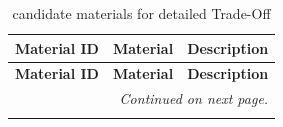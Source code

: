 \begin{longtable}{|c|p{2.25cm}|p{10.75cm}|}
        \caption{candidate materials for detailed Trade-Off}
        \label{tab:materials_trade-off_candidates_desc}\\

\hline
       \textbf{Material ID} & \textbf{Material} & \textbf{Description}\\\hline\hline
\endfirsthead

\hline
       \textbf{Material ID} & \textbf{Material} & \textbf{Description}\\\hline\hline
\endhead

\hline
\multicolumn{3}{r}{\textit{Continued on next page.}} \\
\endfoot

\hline
\endlastfoot


\end{longtable}
